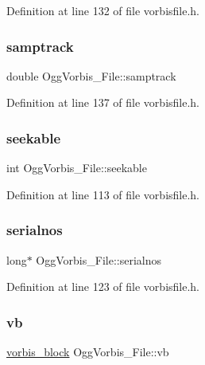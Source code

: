 Definition at line 132 of file vorbisfile.\+h.

\mbox{\label{struct_ogg_vorbis___file_a3fcbfeaad027ada99496dfcaf94866a9}} 
\subsubsection{\texorpdfstring{samptrack}{samptrack}}
{\footnotesize\ttfamily double Ogg\+Vorbis\+\_\+\+File\+::samptrack}



Definition at line 137 of file vorbisfile.\+h.

\mbox{\label{struct_ogg_vorbis___file_a2a390c4f15c0d1fe0cf9c90fd0bae087}} 
\subsubsection{\texorpdfstring{seekable}{seekable}}
{\footnotesize\ttfamily int Ogg\+Vorbis\+\_\+\+File\+::seekable}



Definition at line 113 of file vorbisfile.\+h.

\mbox{\label{struct_ogg_vorbis___file_abd5a9adc78abd620ce2c63bd153df150}} 
\subsubsection{\texorpdfstring{serialnos}{serialnos}}
{\footnotesize\ttfamily long$\ast$ Ogg\+Vorbis\+\_\+\+File\+::serialnos}



Definition at line 123 of file vorbisfile.\+h.

\mbox{\label{struct_ogg_vorbis___file_a3201599977a781b7bf559167cd892638}} 
\subsubsection{\texorpdfstring{vb}{vb}}
{\footnotesize\ttfamily \mbox{\hyperlink{structvorbis__block}{vorbis\+\_\+block}} Ogg\+Vorbis\+\_\+\+File\+::vb}



